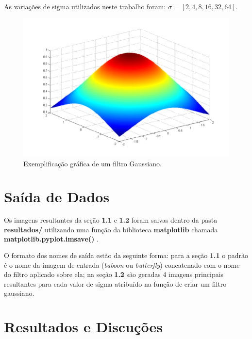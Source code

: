 \documentclass[twoside,twocolumn]{article}
\begin{document}
As variações de sigma utilizados neste trabalho foram: $\sigma = \left[2,4,8,16,32,64\right]$.

\begin{figure}[H]
\begin{center}
	\includegraphics[scale=.2]{figures/filtro_gaussiano.png}
\caption{Exemplificação gráfica de um filtro Gaussiano.} \label{gdimotes}
\end{center}
\end{figure}


\section{Saída de Dados}

Os imagens resultantes da seção \textbf{1.1} e \textbf{1.2} foram salvas dentro da pasta \textbf{resultados/} utilizando uma função da biblioteca \textbf{matplotlib} chamada \textbf{matplotlib.pyplot.imsave()} \cite{b3}.

O formato dos nomes de saída estão da seguinte forma: para a seção \textbf{1.1} o padrão é o nome da imagem de entrada (\textit{baboon} ou \textit{butterfly}) concatenado com o nome do filtro aplicado sobre ela; na seção \textbf{1.2} são geradas 4 imagens principais resultantes para cada valor de sigma atribuído na função de criar um filtro gaussiano.


\section{Resultados e Discuções}
\end{document}

